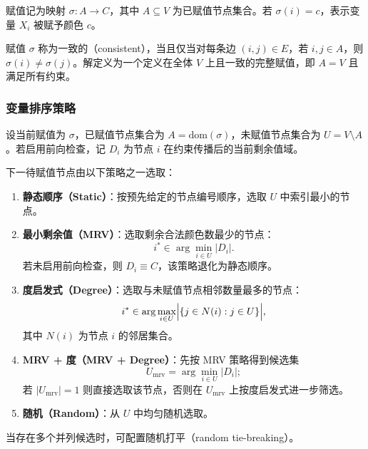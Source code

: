 赋值记为映射 $\sigma\colon A\to C$，其中 $A\subseteq V$ 为已赋值节点集合。若 $\sigma(i)=c$，表示变量 $X_i$ 被赋予颜色 $c$。

赋值 $\sigma$ 称为一致的（consistent），当且仅当对每条边 $(i,j)\in E$，若 $i,j\in A$，则 $\sigma(i)\neq \sigma(j)$。解定义为一个定义在全体 $V$ 上且一致的完整赋值，即 $A=V$ 且满足所有约束。

\subsubsection{变量排序策略}
设当前赋值为 $\sigma$，已赋值节点集合为 $A=\mathrm{dom}(\sigma)$，未赋值节点集合为 $U=V\setminus A$。若启用前向检查，记 $D_i$ 为节点 $i$ 在约束传播后的当前剩余值域。

下一待赋值节点由以下策略之一选取：
\begin{enumerate}
  \item \textbf{静态顺序（Static）}：按预先给定的节点编号顺序，选取 $U$ 中索引最小的节点。
  \item \textbf{最小剩余值（MRV）}：选取剩余合法颜色数最少的节点：
  \begin{equation}
    i^{*}\in \arg\min_{i\in U} |D_i|.
  \end{equation}
  若未启用前向检查，则 $D_i\equiv C$，该策略退化为静态顺序。
  \item \textbf{度启发式（Degree）}：选取与未赋值节点相邻数量最多的节点：
  \begin{equation}
    i^{*}\in \arg\max_{i\in U}\Bigl|\{j\in N(i): j\in U\}\Bigr|,
  \end{equation}
  其中 $N(i)$ 为节点 $i$ 的邻居集合。
  \item \textbf{MRV + 度（MRV + Degree）}：先按 MRV 策略得到候选集
  \begin{equation}
    U_{\mathrm{mrv}}=\arg\min_{i\in U}|D_i|;
  \end{equation}
  若 $|U_{\mathrm{mrv}}|=1$ 则直接选取该节点，否则在 $U_{\mathrm{mrv}}$ 上按度启发式进一步筛选。
  \item \textbf{随机（Random）}：从 $U$ 中均匀随机选取。
\end{enumerate}
当存在多个并列候选时，可配置随机打平（random tie-breaking）。

